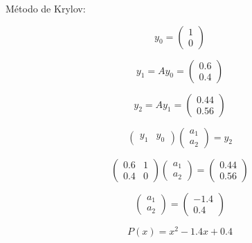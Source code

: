 \begin{frame}
	\begin{solution}
		Método de Krylov:

		\begin{equation*}
			y_{0}=
			\begin{pmatrix}
				1 \\
				0
			\end{pmatrix}
		\end{equation*}

		\begin{equation*}
			y_{1}=
			Ay_{0}=
			\begin{pmatrix}
				0.6 \\
				0.4
			\end{pmatrix}
		\end{equation*}

		\begin{equation*}
			y_{2}=
			Ay_{1}=
			\begin{pmatrix}
				0.44 \\
				0.56
			\end{pmatrix}
		\end{equation*}

		\begin{equation*}
			\begin{pmatrix}
				y_{1} & y_{0}
			\end{pmatrix}
			\begin{pmatrix}
				a_{1} \\
				a_{2}
			\end{pmatrix}=
			y_{2}
		\end{equation*}

		\begin{equation*}
			\begin{pmatrix}
				0.6 & 1 \\
				0.4 & 0
			\end{pmatrix}
			\begin{pmatrix}
				a_{1} \\
				a_{2}
			\end{pmatrix}=
			\begin{pmatrix}
				0.44 \\
				0.56
			\end{pmatrix}
		\end{equation*}

		\begin{equation*}
			\begin{pmatrix}
				a_{1} \\
				a_{2}
			\end{pmatrix}=
			\begin{pmatrix}
				-1.4 \\
				0.4
			\end{pmatrix}
		\end{equation*}

		\begin{equation*}
			P\left(x\right)=
			x^{2}-1.4x+0.4
		\end{equation*}
	\end{solution}
\end{frame}

